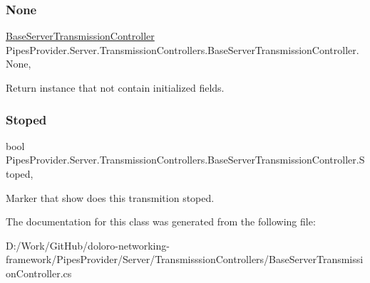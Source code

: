 \subsubsection{\texorpdfstring{None}{None}}
{\footnotesize\ttfamily \mbox{\hyperlink{class_pipes_provider_1_1_server_1_1_transmission_controllers_1_1_base_server_transmission_controller}{Base\+Server\+Transmission\+Controller}} Pipes\+Provider.\+Server.\+Transmission\+Controllers.\+Base\+Server\+Transmission\+Controller.\+None\hspace{0.3cm}{\ttfamily [static]}, {\ttfamily [get]}}



Return instance that not contain initialized fields. 

\mbox{\label{class_pipes_provider_1_1_server_1_1_transmission_controllers_1_1_base_server_transmission_controller_ae159fdf4582f9419d9e3616d2aa2d37e}} 
\subsubsection{\texorpdfstring{Stoped}{Stoped}}
{\footnotesize\ttfamily bool Pipes\+Provider.\+Server.\+Transmission\+Controllers.\+Base\+Server\+Transmission\+Controller.\+Stoped\hspace{0.3cm}{\ttfamily [get]}, {}}



Marker that show does this transmition stoped. 



The documentation for this class was generated from the following file\+:\begin{DoxyCompactItemize}
\item 
D\+:/\+Work/\+Git\+Hub/doloro-\/networking-\/framework/\+Pipes\+Provider/\+Server/\+Transmisssion\+Controllers/Base\+Server\+Transmission\+Controller.\+cs\end{DoxyCompactItemize}
